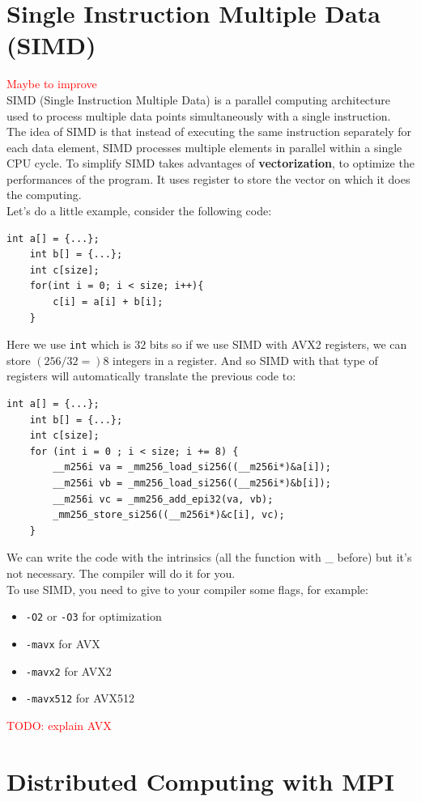 \documentclass[12pt, openany]{report}
\theoremstyle{definition}
\newcommand{\code}[1]{\colorbox{light-gray}{\texttt{#1}}}
\begin{document}
\chapter{Single Instruction Multiple Data (SIMD)}
\textcolor{red}{Maybe to improve}\\
SIMD (Single Instruction Multiple Data) is a parallel computing architecture used to process multiple data points simultaneously with a single instruction.\\
The idea of SIMD is that instead of executing the same instruction separately for each data element, SIMD processes multiple elements in parallel within a single CPU cycle. To simplify SIMD takes advantages of \textbf{vectorization}, to optimize the performances of the program. It uses register to store the vector on which it does the computing.\\
Let's do a little example, consider the following code:
\begin{lstlisting}[style=CppStyle]
	int a[] = {...};
	int b[] = {...};
	int c[size];
	for(int i = 0; i < size; i++){
		c[i] = a[i] + b[i];
	}
\end{lstlisting}
Here we use \texttt{int} which is $32$ bits so if we use SIMD with AVX2 registers, we can store $(256/32 =) 8$ integers in a register. And so SIMD with that type of registers will automatically translate the previous code to:
\begin{lstlisting}[style=CppStyle]
	int a[] = {...};
	int b[] = {...};
	int c[size];
    for (int i = 0 ; i < size; i += 8) {
        __m256i va = _mm256_load_si256((__m256i*)&a[i]);  
        __m256i vb = _mm256_load_si256((__m256i*)&b[i]);  
        __m256i vc = _mm256_add_epi32(va, vb);             
        _mm256_store_si256((__m256i*)&c[i], vc);          
    }
\end{lstlisting}
We can write the code with the intrinsics (all the function with \_ before) but it's not necessary. The compiler will do it for you.\\
To use SIMD, you need to give to your compiler some flags, for example:
\begin{itemize}
	\item \code{-O2} or \code{-O3} for optimization
	\item \code{-mavx} for AVX
	\item \code{-mavx2} for AVX2
	\item \code{-mavx512} for AVX512
\end{itemize}
\textcolor{red}{TODO: explain AVX}\\
\chapter{Distributed Computing with MPI}
\end{document}
